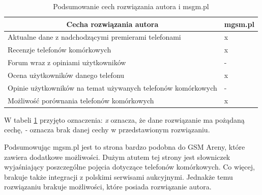 \begin{table}
    \centering
    \begin{tabular}{|l|l|}
        \hline
        \multicolumn{1}{|c|}{Cecha rozwiązania autora}    & \multicolumn{1}{c|}{mgsm.pl} \\ \hline
        Aktualne dane z nadchodzącymi premierami telefonami & x                             \\ \hline
        Recenzje telefonów komórkowych                                  & x                                \\ \hline
        Forum wraz z opiniami użytkowników                   & -                                \\ \hline
        Ocena użytkowników danego telefonu                  & x                             \\ \hline
        Opinie użytkowników na temat używanych telefonów komórkowych    & -                                 \\ \hline
        Możliwość porównania telefonów komórkowych                      & x                                \\ \hline
    \end{tabular}
    \caption{Podsumowanie cech rozwiązania autora i msgm.pl}
    \label{comparison_mgsm}
\end{table}
W tabeli \ref*{comparison_mgsm} przyjęto oznaczenia: \textit{x} oznacza, że dane rozwiązanie ma pożądaną cechę, \textit{-} oznacza brak danej cechy w przedstawionym rozwiązaniu.

Podsumowując mgsm.pl jest to strona bardzo podobna do GSM Areny, które zawiera dodatkowe możliwości. Dużym atutem tej strony jest słowniczek wyjaśniający poszczególne pojęcia dotyczące telefonów komórkowych. Co więcej, brakuje także integracji z polskimi serwisami aukcyjnymi. Jednakże temu rozwiązaniu brakuje możliwości, które posiada rozwiązanie autora.

